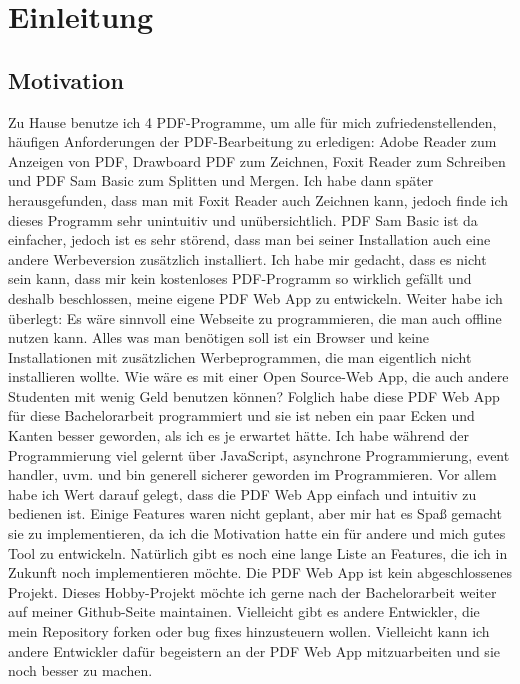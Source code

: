 \chapter{Einleitung}

\section{Motivation}
Zu Hause benutze ich 4 PDF-Programme, um alle für mich zufriedenstellenden, häufigen Anforderungen der PDF-Bearbeitung zu erledigen: Adobe Reader zum Anzeigen von PDF, Drawboard PDF zum Zeichnen, Foxit Reader zum Schreiben und PDF Sam Basic zum Splitten und Mergen. Ich habe dann später herausgefunden, dass man mit Foxit Reader auch Zeichnen kann, jedoch finde ich dieses Programm sehr unintuitiv und unübersichtlich. PDF Sam Basic ist da einfacher, jedoch ist es sehr störend, dass man bei seiner Installation auch eine andere Werbeversion zusätzlich installiert. Ich habe mir gedacht, dass es nicht sein kann, dass mir kein kostenloses PDF-Programm so wirklich gefällt und deshalb beschlossen, meine eigene PDF Web App zu entwickeln. Weiter habe ich überlegt: Es wäre sinnvoll eine Webseite zu programmieren, die man auch offline nutzen kann. Alles was man benötigen soll ist ein Browser und keine Installationen mit zusätzlichen Werbeprogrammen, die man eigentlich nicht installieren wollte. Wie wäre es mit einer Open Source-Web App, die auch andere Studenten mit wenig Geld benutzen können? Folglich habe diese PDF Web App für diese Bachelorarbeit programmiert und sie ist neben ein paar Ecken und Kanten besser geworden, als ich es je erwartet hätte. Ich habe während der Programmierung viel gelernt über JavaScript, asynchrone Programmierung, event handler, uvm. und bin generell sicherer geworden im Programmieren. Vor allem habe ich Wert darauf gelegt, dass die PDF Web App einfach und intuitiv zu bedienen ist. Einige Features waren nicht geplant, aber mir hat es Spaß gemacht sie zu implementieren, da ich die Motivation hatte ein für andere und mich gutes Tool zu entwickeln. Natürlich gibt es noch eine lange Liste an Features, die ich in Zukunft noch implementieren möchte. Die PDF Web App ist kein abgeschlossenes Projekt. Dieses Hobby-Projekt möchte ich gerne nach der Bachelorarbeit weiter auf meiner Github-Seite maintainen. Vielleicht gibt es andere Entwickler, die mein Repository forken oder bug fixes hinzusteuern wollen. Vielleicht kann ich andere Entwickler dafür begeistern an der PDF Web App mitzuarbeiten und sie noch besser zu machen. 

